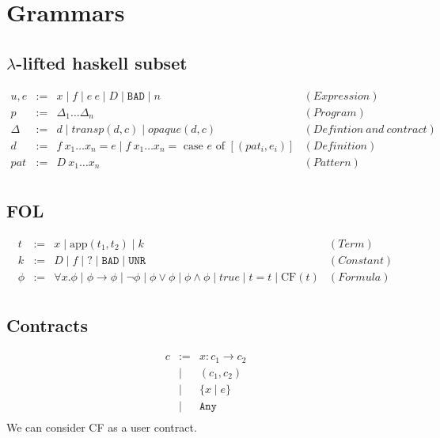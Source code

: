 \documentclass{article}
\begin{document}
\newcommand{\etrans}[1]{\mathcal{E} \llbracket #1 \rrbracket}
\newcommand{\dtrans}[1]{\mathcal{D} \llbracket #1 \rrbracket}
\newcommand{\strans}[1]{\mathcal{S} \llbracket #1 \rrbracket}
\newcommand{\trans}[1]{\llbracket #1 \rrbracket}

\newcommand{\unr}{\texttt{UNR}}
\newcommand{\bad}{\texttt{BAD}}
\newcommand{\any}{\texttt{Any}}
\newcommand{\ok}{\texttt{Ok}}

\thispagestyle{empty}
\section{Grammars}
\subsection{$\lambda$-lifted haskell subset}
\begin{eqnarray*}
  u,e &:=& x \mid f \mid e~e \mid D \mid \bad \mid n & (Expression)\\
  p &:=& \Delta_1 \dots \Delta_n & (Program) \\
  \Delta &:=& d \mid transp (d,c) \mid opaque (d,c) & (Defintion~and~contract) \\
  d &:=& f~x_1 \dots x_n = e \mid f~x_1 \dots x_n = \mbox{ case } e \mbox{ of } [(pat_i,e_i)] & (Definition) \\
  pat &:=&D~x_1 \dots x_n & (Pattern) \\
\end{eqnarray*}

\subsection{FOL}
\begin{eqnarray*}
  t &:=& x \mid \mbox{app}(t_1,t_2) \mid k & (Term) \\
  k &:=& D \mid f \mid ? \mid \bad \mid \unr & (Constant) \\
  \phi &:=& \forall x.\phi \mid \phi \to \phi \mid \lnot \phi \mid \phi \lor \phi \mid \phi \land \phi \mid true \mid t=t \mid \mbox{CF}(t)& (Formula) \\
\end{eqnarray*}

\subsection{Contracts}
\begin{eqnarray*}
  c &:=& x:c_1 \to c_2\\
  &\mid& (c_1,c_2) \\
  &\mid& \{ x \mid e \} \\
  &\mid& \any \\
\end{eqnarray*}
We can consider CF as a user contract.
\end{document}
